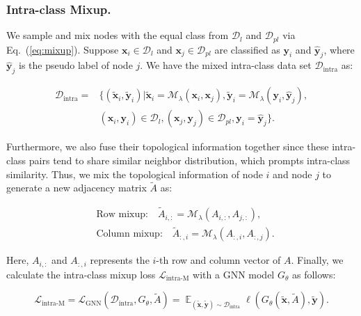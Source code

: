 \documentclass[letterpaper]{article} %
\newcommand{\labeledset}{\mathcal{D}_{l}}
\newcommand{\aVec}[1]{\mathbf{#1}}
\newcommand{\intraset}{\mathcal{D}_{\text{intra}}}
\DeclareMathOperator*{\expectation}{\mathbb{E}}
\begin{document}
\subsubsection{Intra-class Mixup.}
 We sample and mix nodes with the equal class from $\labeledset$ and $\mathcal{D}_{pl}$ via Eq.~(\ref{eq:mixup}). Suppose $\aVec{x}_{i} \in \labeledset$ and $\aVec{x}_{j} \in \mathcal{D}_{pl}$ are classified as $\aVec{y}_{i}$ and $\hat{\aVec{y}}_{j}$, where $\hat{\aVec{y}}_{j}$ is the pseudo label of node $j$. We have the mixed intra-class data set $\intraset$ as:
 \begin{small}
 	\begin{equation}
 	\label{D-intra}
 	\begin{split}
 	\intraset = &\{(\tilde{\aVec{x}}_{i}, \tilde{\aVec{y}}_{i} )|\tilde{\aVec{x}}_{i} = \mathcal{M}_{\lambda}(\aVec{x}_{i}, \aVec{x}_{j}),  \tilde{\aVec{y}}_{i} = \mathcal{M}_{\lambda}(\aVec{y}_{i}, \hat{\aVec{y}}_{j}), \\
 				&(\aVec{x}_{i}, \aVec{y}_{i}) \in \labeledset, (\aVec{x}_{j}, \aVec{y}_{j}) \in \mathcal{D}_{pl}, \aVec{y}_{i} = \hat{\aVec{y}}_{j}\}.
 	\end{split}
 	\end{equation}
 \end{small}
Furthermore, we also fuse their topological information together since these intra-class pairs tend to share similar neighbor distribution, which prompts intra-class similarity. Thus, we mix the topological information of node $i$ and node $j$ to generate a new adjacency matrix $\tilde{A}$ as:
\begin{small}
	\begin{equation}
	\begin{split}
		&\text{Row mixup:}\quad\tilde{A}_{i, :} = \mathcal{M}_{\lambda}(A_{i, :}, A_{j, :}),\\
		&\text{Column mixup:}\quad\tilde{A}_{:, i} = \mathcal{M}_{\lambda}(A_{:, i}, A_{:, j}).
	\end{split}
	\end{equation}
\end{small}
Here, $A_{i, :}$ and $A_{:, i}$ represents the $i$-th row and column vector of $A$. Finally, we calculate the intra-class mixup loss $\mathcal{L}_{\text{intra-M}}$ with a GNN model $G_{\theta}$ as follows:
\begin{small}
	\begin{equation}
	\label{loss-intra-mixup}
		\mathcal{L}_{\text{intra-M}} = \mathcal{L}_{\text{GNN}} (\intraset, G_{\theta}, \tilde{A}) = \expectation_{(\tilde{\aVec{x}}, \tilde{\aVec{y}}) \sim \intraset} \ell(G_{\theta}(\tilde{\aVec{x}}, \tilde{A}), \tilde{\aVec{y}}).
	\end{equation}
\end{small}
\end{document}
